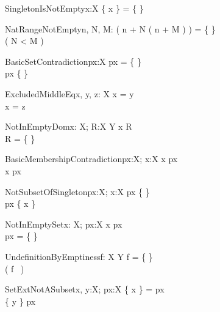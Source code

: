 \begin{theorem}{SingletonIsNotEmpty}{x:X}
\{ x \} = \{ \}
\end{theorem}

\begin{theorem}{NatRangeNotEmpty}{n, \const N, \const M: \nat}
( n + N \upto ( n + M ) ) = \{ \} \\
\eval( N < M )
\end{theorem}

\begin{theorem}{BasicSetContradiction}{px:\power X}
px = \{ \} \\
px \neq \{ \}
\end{theorem}

\begin{theorem}{ExcludedMiddleEq}{x, \const y, \const z: X}
x = y \\
x = z \\
\end{theorem}

\begin{theorem}{NotInEmptyDom}{x: X; R:X \rel Y}
x \in \dom R \\
R = \{ \}
\end{theorem}

\begin{theorem}{BasicMembershipContradiction}{px:\power X; x:X}
x \in px \\
x \notin px
\end{theorem}

\begin{theorem}{NotSubsetOfSingleton}{px:\power X; x:X}
px \neq \{ \} \\
px \subset \{ x \} 
\end{theorem}

\begin{theorem}{NotInEmptySet}{x: X; px:\power X}
x \in px \\
px = \{ \}
\end{theorem}

\begin{theorem}{UndefinitionByEmptiness}{f: X \pfun Y}
f = \{ \} \\
\sw( f~ \anything ) \\
\end{theorem}

\begin{theorem}{SetExtNotASubset}{\const x, \const y:X; px:\power X}
\{ x \} = px \\
\{ y \} \subset px
\end{theorem}

